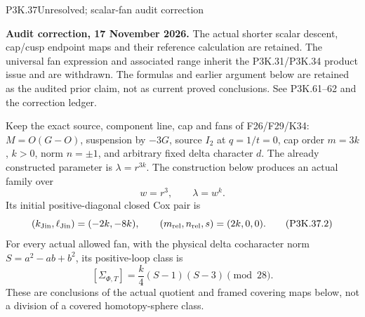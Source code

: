 \begin{statement}{P3K.37}{Unresolved; scalar-fan audit correction}
\par\noindent\textbf{Audit correction, 17 November 2026.} The actual shorter scalar descent, cap/cusp endpoint maps and their reference calculation are retained. The universal fan expression and associated range inherit the P3K.31/P3K.34 product issue and are withdrawn. The formulas and earlier argument below are retained as the audited prior claim, not as current proved conclusions. See P3K.61--62 and the correction ledger.
\medskip

Keep the exact source, component line, cap and fans of F26/F29/K34:
\(M=O(G-O)\), suspension by \(-3G\), source \(I_2\) at
\(q=1/t=0\), cap order \(m=3k\), \(k>0\), norm
\(n=\pm1\), and arbitrary fixed delta character \(d\).
The already constructed parameter is \(\lambda=r^{3k}\).
The construction below produces an actual family over
\[
 w=r^3,\qquad \lambda=w^k.                                      \tag{P3K.37.1}
\]
Its initial positive-diagonal closed Cox pair is
\[
 (k_{\rm Jin},\ell_{\rm Jin})=(-2k,-8k),\qquad
 (m_{\rm rel},n_{\rm rel},s)=(2k,0,0).
                                                                    \tag{P3K.37.2}
\]
For every actual allowed fan, with the physical delta cocharacter norm
\(S=a^2-ab+b^2\), its positive-loop class is
\[
 [\Sigma_{\Phi,T}]=\frac{k}{4}(S-1)(S-3)\pmod {28}.              \tag{P3K.37.3}
\]
These are conclusions of the actual quotient and framed covering maps below,
not a division of a covered homotopy-sphere class.
\end{statement}
